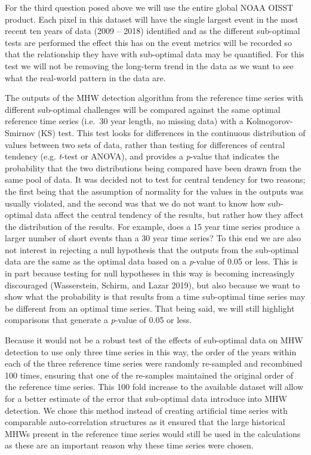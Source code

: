 \documentclass[]{article}
\begin{document}
For the third question posed above we will use the entire global NOAA
OISST product. Each pixel in this dataset will have the single largest
event in the most recent ten years of data (2009 -- 2018) identified and
as the different sub-optimal tests are performed the effect this has on
the event metrics will be recorded so that the relationship they have
with sub-optimal data may be quantified. For this test we will not be
removing the long-term trend in the data as we want to see what the
real-world pattern in the data are.

The outputs of the MHW detection algorithm from the reference time
series with different sub-optimal challenges will be compared against
the same optimal reference time series (i.e.~30 year length, no missing
data) with a Kolmogorov-Smirnov (KS) test. This test looks for
differences in the continuous distribution of values between two sets of
data, rather than testing for differences of central tendency (e.g.
\emph{t}-test or ANOVA), and provides a \emph{p}-value that indicates
the probability that the two distributions being compared have been
drawn from the same pool of data. It was decided not to test for central
tendency for two reasons; the first being that the assumption of
normality for the values in the outputs was usually violated, and the
second was that we do not want to know how sub-optimal data affect the
central tendency of the results, but rather how they affect the
distribution of the results. For example, does a 15 year time series
produce a larger number of short events than a 30 year time series? To
this end we are also not interest in rejecting a null hypothesis that
the outputs from the sub-optimal data are the same as the optimal data
based on a \emph{p}-value of 0.05 or less. This is in part because
testing for null hypotheses in this way is becoming increasingly
discouraged (Wasserstein, Schirm, and Lazar 2019), but also because we
want to show what the probability is that results from a time
sub-optimal time series may be different from an optimal time series.
That being said, we will still highlight comparisons that generate a
\emph{p}-value of 0.05 or less.

Because it would not be a robust test of the effects of sub-optimal data
on MHW detection to use only three time series in this way, the order of
the years within each of the three reference time series were randomly
re-sampled and recombined 100 times, ensuring that one of the re-samples
maintained the original order of the reference time series. This 100
fold increase to the available dataset will allow for a better estimate
of the error that sub-optimal data introduce into MHW detection. We
chose this method instead of creating artificial time series with
comparable auto-correlation structures as it ensured that the large
historical MHWs present in the reference time series would still be used
in the calculations as these are an important reason why these time
series were chosen.
\end{document}

